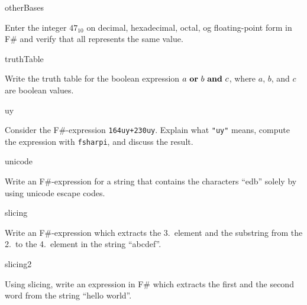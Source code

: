 \begin{defproblem}{otherBases}
  \begin{onlyproblem}%
    Enter the integer $47_{10}$ on decimal, hexadecimal, octal, og floating-point form in F\# and verify that all represents the same value.
\end{onlyproblem}
\end{defproblem}

\begin{defproblem}{truthTable}
  \begin{onlyproblem}%
    Write the truth table for the boolean expression $a \text{ \texttt{\bf or} } b \text{ \texttt{\bf and} } c$, where $a$, $b$, and $c$ are boolean values.
  \end{onlyproblem}
\end{defproblem}

\begin{defproblem}{uy}
  \begin{onlyproblem}%
    Consider the F\#-expression \lstinline{164uy+230uy}. Explain what \lstinline{"uy"} means, compute the expression with \lstinline[language=console]{fsharpi}, and discuss the result.
  \end{onlyproblem}
\end{defproblem}

\begin{defproblem}{unicode}
  \begin{onlyproblem}%
    Write an F\#-expression for a string that contains the characters ``edb'' solely by using unicode escape codes.
  \end{onlyproblem}
\end{defproblem}

\begin{defproblem}{slicing}
  \begin{onlyproblem}%
    Write an F\#-expression which extracts the 3.\ element and the substring from the 2.\ to the 4.\ element in the string ``abcdef''.
  \end{onlyproblem}
\end{defproblem}

\begin{defproblem}{slicing2}
  \begin{onlyproblem}%
    Using slicing, write an expression in F\# which extracts the first and the second word from the string “hello world”.
  \end{onlyproblem}
\end{defproblem}

